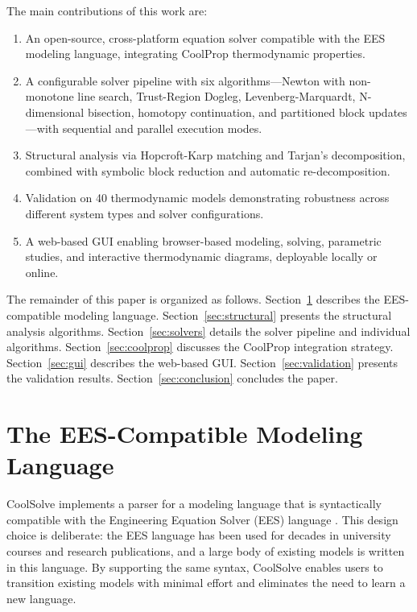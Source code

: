 \documentclass[review,3p]{elsarticle}
\begin{document}
The main contributions of this work are:
\begin{enumerate}
    \item An open-source, cross-platform equation solver compatible with the EES modeling language, integrating CoolProp thermodynamic properties.
    \item A configurable solver pipeline with six algorithms---Newton with non-monotone line search, Trust-Region Dogleg, Levenberg-Marquardt, N-dimensional bisection, homotopy continuation, and partitioned block updates---with sequential and parallel execution modes.
    \item Structural analysis via Hopcroft-Karp matching and Tarjan's decomposition, combined with symbolic block reduction and automatic re-decomposition.
    \item Validation on 40 thermodynamic models demonstrating robustness across different system types and solver configurations.
    \item A web-based GUI enabling browser-based modeling, solving, parametric studies, and interactive thermodynamic diagrams, deployable locally or online.
\end{enumerate}

The remainder of this paper is organized as follows. Section~\ref{sec:language} describes the EES-compatible modeling language. Section~\ref{sec:structural} presents the structural analysis algorithms. Section~\ref{sec:solvers} details the solver pipeline and individual algorithms. Section~\ref{sec:coolprop} discusses the CoolProp integration strategy. Section~\ref{sec:gui} describes the web-based GUI. Section~\ref{sec:validation} presents the validation results. Section~\ref{sec:conclusion} concludes the paper.

\section{The EES-Compatible Modeling Language}
\label{sec:language}

CoolSolve implements a parser for a modeling language that is syntactically compatible with the Engineering Equation Solver (EES) language \cite{Klein2023}. This design choice is deliberate: the EES language has been used for decades in university courses and research publications, and a large body of existing models is written in this language. By supporting the same syntax, CoolSolve enables users to transition existing models with minimal effort and eliminates the need to learn a new language.
\end{document}
